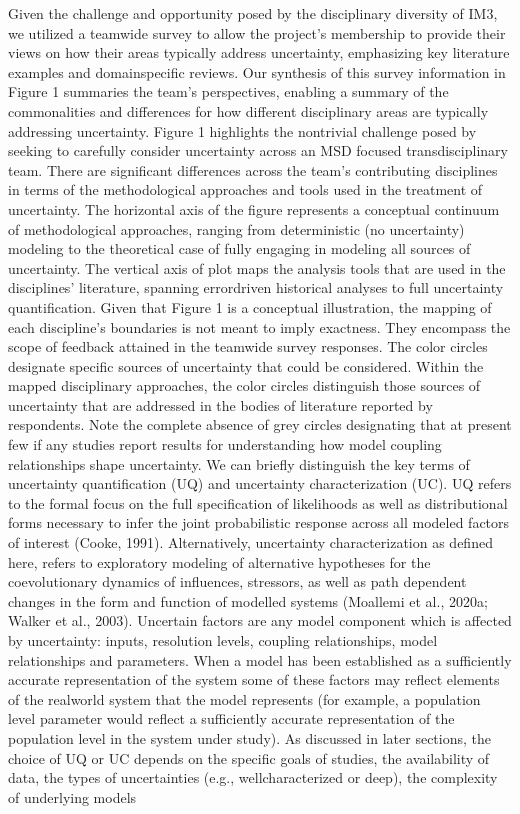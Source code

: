 \documentclass[letterpaper,10pt,english]{sphinxmanual}
\begin{document}
\sphinxAtStartPar
Given the challenge and opportunity posed by the disciplinary diversity of IM3, we utilized a team\sphinxhyphen{}wide survey to allow the project’s membership to provide their views on how their areas typically address uncertainty, emphasizing key literature examples and domain\sphinxhyphen{}specific reviews. Our synthesis of this survey information in Figure 1 summaries the team’s perspectives, enabling a summary of the commonalities and differences for how different disciplinary areas are typically addressing uncertainty. Figure 1 highlights the non\sphinxhyphen{}trivial challenge posed by seeking to carefully consider uncertainty across an MSD focused transdisciplinary team. There are significant differences across the team’s contributing disciplines in terms of the methodological approaches and tools used in the treatment of uncertainty. The horizontal axis of the figure represents a conceptual continuum of methodological approaches, ranging from deterministic (no uncertainty) modeling to the theoretical case of fully engaging in modeling all sources of uncertainty. The vertical axis of plot maps the analysis tools that are used in the disciplines’ literature, spanning error\sphinxhyphen{}driven historical analyses to full uncertainty quantification. Given that Figure 1 is a conceptual illustration, the mapping of each discipline’s boundaries is not meant to imply exactness. They encompass the scope of feedback attained in the team\sphinxhyphen{}wide survey responses. The color circles designate specific sources of uncertainty that could be considered. Within the mapped disciplinary approaches, the color circles distinguish those sources of uncertainty that are addressed in the bodies of literature reported by respondents. Note the complete absence of grey circles designating that at present few if any studies report results for understanding how model coupling relationships shape uncertainty. We can briefly distinguish the key terms of uncertainty quantification (UQ) and uncertainty characterization (UC). UQ refers to the formal focus on the full specification of likelihoods as well as distributional forms necessary to infer the joint  probabilistic response across all modeled factors of interest (Cooke, 1991). Alternatively, uncertainty characterization as defined here, refers to exploratory modeling of alternative hypotheses for the co\sphinxhyphen{}evolutionary dynamics of influences, stressors, as well as path dependent changes in the form and function of modelled systems (Moallemi et al., 2020a; Walker et al., 2003). Uncertain factors are any model component which is affected by uncertainty: inputs, resolution levels, coupling relationships, model relationships and parameters. When a model has been established as a sufficiently accurate representation of the system some of these factors may reflect elements of the real\sphinxhyphen{}world system that the model represents (for example, a population level parameter would reflect a sufficiently accurate representation of the population level in the system under study). As discussed in later sections, the choice of UQ or UC depends on the specific goals of studies, the availability of data, the types of uncertainties (e.g., well\sphinxhyphen{}characterized or deep), the complexity of underlying models 
\end{document}
